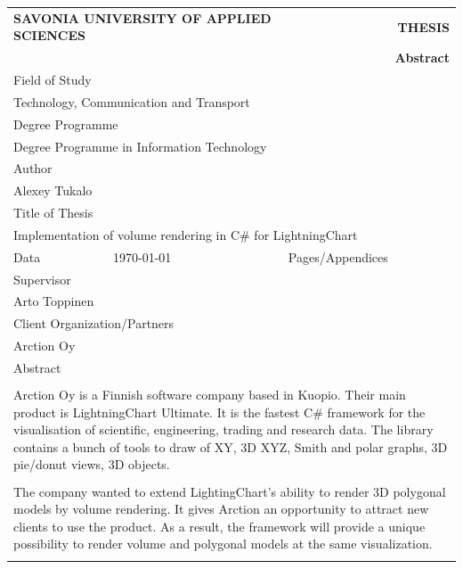 \documentclass[twoside, english, 11pt]{report}
\begin{document}
\begin{table}[!h]
\begin{tabular}{| l | l | l | l |}
\multicolumn{2}{l}{\textbf{SAVONIA UNIVERSITY OF APPLIED SCIENCES}}&
\multicolumn{2}{r}{\textbf{THESIS}}\\
\multicolumn{4}{r}{\textbf{Abstract}}\\
\hline
\multicolumn{4}{|l|}{Field of Study}\\
\multicolumn{4}{|l|}{Technology, Communication and Transport}\\
\hline
\multicolumn{4}{|l|}{Degree Programme}\\
\multicolumn{4}{|l|}{Degree Programme in Information Technology}\\
\hline
\multicolumn{4}{|l|}{Author}\\
\multicolumn{4}{|l|}{Alexey Tukalo}\\
\hline
\multicolumn{4}{|l|}{Title of Thesis}\\
\multicolumn{4}{|l|}{Implementation of volume rendering in C\# for LightningChart}\\
\hline
Data & \today & Pages/Appendices & \pageref{LastPage}\\
\hline
\multicolumn{4}{|l|}{Supervisor}\\
\multicolumn{4}{|l|}{Arto Toppinen}\\
\hline
\multicolumn{4}{|l|}{Client Organization/Partners}\\
\multicolumn{4}{|l|}{Arction Oy}\\
\hline
\multicolumn{4}{|l|}{Abstract}\\
\multicolumn{4}{|l|}{ }\\
\multicolumn{4}{|p{14cm}|}{
Arction Oy is a Finnish software company based in Kuopio. Their main product is LightningChart Ultimate. It is the fastest C\# framework for the visualisation of scientific, engineering, trading and research data. The library contains a bunch of tools to draw of XY, 3D XYZ, Smith and polar graphs, 3D pie/donut views, 3D objects.
}\\
\multicolumn{4}{|l|}{ }\\
\multicolumn{4}{|p{14cm}|}{
The company wanted to extend LightingChart's ability to render 3D polygonal models by volume rendering. It gives Arction an opportunity to attract new clients to use the product. As a result, the framework will provide a unique possibility to render volume and polygonal models at the same visualization.
}\\
\multicolumn{4}{|l|}{ }\\

\end{tabular}
\end{table}
\end{document}
